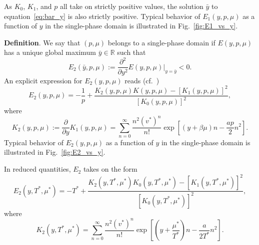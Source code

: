 \documentclass[12pt]{article}
\numberwithin{equation}{section}
\begin{document}
	As $K_0$, $K_1$, and $p$ all take on strictly positive values, the solution $\bar{y}$ to equation~\eqref{eq:bar_y} is also strictly positive.
	Typical behavior of $E_1(y,p,\mu)$ as a function of $y$ in the single-phase domain is illustrated in Fig.~\ref{fig:E1_vs_y}.
	
	\textbf{Definition}. We say that $(p, \mu)$ belongs to a single-phase domain if $E(y,p,\mu)$ has a unique global maximum $\bar{y} \in \mathbb{R}$ such that
	\begin{equation}
		\label{def:E2}
		E_2(\bar{y}, p, \mu) := \frac{\partial^2}{\partial y^2} E(y,p,\mu)\big|_{y=\bar{y}} < 0.
	\end{equation}
	An explicit expression for $E_2(y,p,\mu)$ reads (cf.~\cite[(20)]{KD22})
	\begin{equation}
		E_2(y,p,\mu) = -\frac{1}{p} + \frac{K_2(y,p,\mu) K(y,p,\mu) - [K_1(y,p,\mu)]^2}{[K_0(y,p,\mu)]^2},
	\end{equation}
	where
	\begin{equation}
		K_2(y,p,\mu) := \frac{\partial}{\partial y} K_1(y,p,\mu) = \sum_{n=0}^{\infty} \frac{n^2 (v^*)^n}{n!} \exp[(y+\beta\mu)n - \frac{ap}{2}n^2].
	\end{equation}
	Typical behavior of $E_2(y,p,\mu)$ as a function of $y$ in the single-phase domain is illustrated in Fig.~\ref{fig:E2_vs_y}.
	
	\begin{mdframed}[linecolor=black,linewidth=1pt,leftline=true]
		In reduced quantities, $E_2$ takes on the form
		\begin{equation}
			\label{def:reducedE2}
			E_2(y,T^*,\mu^*) = -T^* + \frac{K_2(y,T^*,\mu^*) K_0(y,T^*,\mu^*) - [K_1(y,T^*,\mu^*)]^2}{[K_0(y,T^*,\mu^*)]^2},
		\end{equation}
		where
		\begin{equation}
			K_2(y,T^*,\mu^*) = \sum_{n=0}^{\infty} \frac{n^2 (v^*)^n}{n!} \exp[\left(y+\frac{\mu^*}{T^*}\right)n - \frac{a}{2T^*}n^2].
		\end{equation}
	\end{mdframed}
	
\end{document}
